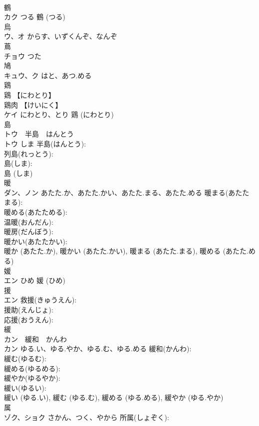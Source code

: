 \documentclass[8pt]{extreport}
\begin{document}
\begin{CJK}{UTF8}{min}
\\	鶴			
\\	カク	つる		鶴 (つる)
\\	烏			
\\	ウ、オ	からす、いずくんぞ、なんぞ		
\\	蔦			
\\	チョウ	つた		
\\	鳩			
\\	キュウ、ク	はと、あつ.める		
\\	鶏			
\\	鶏 【にわとり】 
\\	鶏肉 【けいにく】 
\\	ケイ	にわとり、とり		鶏 (にわとり)
\\	島			
\\	トウ　半島　はんとう
\\	トウ	しま	半島(はんとう): 
\\	列島(れっとう): 
\\	島(しま): 
\\	島 (しま)
\\	暖			
\\	ダン、ノン	あたた.か、あたた.かい、あたた.まる、あたた.める	暖まる(あたたまる): 
\\	暖める(あたためる): 
\\	温暖(おんだん): 
\\	暖房(だんぼう): 
\\	暖かい(あたたかい): 
\\	暖か (あたた.か), 暖かい (あたた.かい), 暖まる (あたた.まる), 暖める (あたた.める)
\\	媛			
\\	エン	ひめ		媛 (ひめ)
\\	援			
\\	エン		救援(きゅうえん): 
\\	援助(えんじょ): 
\\	応援(おうえん): 
\\	緩			
\\	カン　緩和　かんわ
\\	カン	ゆる.い、ゆる.やか、ゆる.む、ゆる.める	緩和(かんわ): 
\\	緩む(ゆるむ): 
\\	緩める(ゆるめる): 
\\	緩やか(ゆるやか): 
\\	緩い(ゆるい): 
\\	緩い (ゆる.い), 緩む (ゆる.む), 緩める (ゆる.める), 緩やか (ゆる.やか)
\\	属			
\\	ゾク、ショク	さかん、つく、やから	所属(しょぞく): 

\end{CJK}
\end{document}
